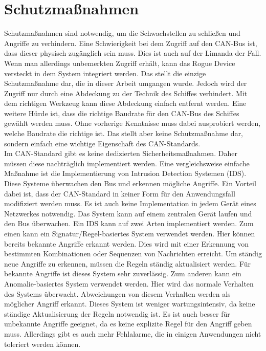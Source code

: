 \section{Schutzmaßnahmen}
Schutzmaßnahmen sind notwendig, um die Schwachstellen zu schließen und Angriffe zu verhindern.
Eine Schwierigkeit bei dem Zugriff auf den CAN-Bus ist, dass dieser physisch zugänglich sein muss. Dies ist auch auf der Limanda
der Fall. Wenn man allerdings unbemerkten Zugriff erhält, kann das Rogue Device versteckt in dem System integriert werden. 
Das stellt die einzige Schutzmaßnahme dar, die in dieser Arbeit umgangen wurde. Jedoch wird der Zugriff nur durch eine Abdeckung zu der Technik des Schiffes
verhindert. Mit dem richtigen Werkzeug kann diese Abdeckung einfach entfernt werden.
Eine weitere Hürde ist, dass die richtige Baudrate für den CAN-Bus des Schiffes gewählt werden muss. Ohne vorherige Kenntnisse
muss dabei ausprobiert werden, welche Baudrate die richtige ist. Das stellt aber keine Schutzmaßnahme dar, sondern einfach
eine wichtige Eigenschaft des CAN-Standards.\\
Im CAN-Standard gibt es keine dedizierten Sicherheitsmaßnahmen. Daher müssen diese nachträglich implementiert werden.
Eine vergleichsweise einfache Maßnahme ist die Implementierung von Intrusion Detection Systemen (IDS). Diese Systeme überwachen
den Bus und erkennen mögliche Angriffe. Ein Vorteil dabei ist, dass der CAN-Standard in keiner Form für den 
Anwendungsfall modifiziert werden muss. Es ist auch keine Implementation in jedem Gerät eines Netzwerkes notwendig.
Das System kann auf einem zentralen Gerät laufen und den Bus überwachen. \cite{Gmiden2016} 
Ein IDS kann auf zwei Arten implementiert werden. Zum einen kann ein Signatur/Regel-basiertes System verwendet werden.
Hier können bereits bekannte Angriffe erkannt werden. Dies wird mit einer Erkennung von bestimmten Kombinationen oder Sequenzen
von Nachrichten erreicht. Um ständig neue Angriffe zu erkennen, müssen die Regeln ständig aktualisiert werden.
Für bekannte Angriffe ist dieses System sehr zuverlässig. Zum anderen kann ein Anomalie-basiertes System verwendet werden.
Hier wird das normale Verhalten des Systems überwacht. Abweichungen von diesem Verhalten werden als möglicher Angriff erkannt.
Dieses System ist weniger wartungsintensiv, da keine ständige Aktualisierung der Regeln notwendig ist. Es ist auch besser für
unbekannte Angriffe geeignet, da es keine explizite Regel für den Angriff geben muss. Allerdings gibt es auch mehr Fehlalarme,
die in einigen Anwendungen nicht toleriert werden können. \cite{Hoppe2009} \\
